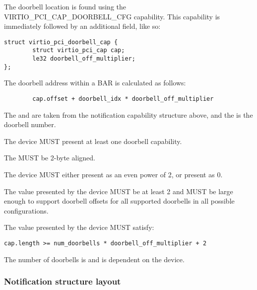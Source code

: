 The doorbell location is found using the VIRTIO_PCI_CAP_DOORBELL_CFG
capability.  This capability is immediately followed by an additional
field, like so:

\begin{lstlisting}
struct virtio_pci_doorbell_cap {
        struct virtio_pci_cap cap;
        le32 doorbell_off_multiplier;
};
\end{lstlisting}

The doorbell address within a BAR is calculated as follows:

\begin{lstlisting}
        cap.offset + doorbell_idx * doorbell_off_multiplier
\end{lstlisting}

The  and  are taken from the
notification capability structure above, and the  is the
doorbell number.

The device MUST present at least one doorbell capability.

The  MUST be 2-byte aligned.

The device MUST either present  as an even power of 2,
or present  as 0.

The value  presented by the device MUST be at least 2
and MUST be large enough to support doorbell offsets for all supported
doorbells in all possible configurations.

The value  presented by the device MUST satisfy:
\begin{lstlisting}
cap.length >= num_doorbells * doorbell_off_multiplier + 2
\end{lstlisting}

The number of doorbells is  and is dependent on the
device.

\subsubsection{Notification structure layout}\label{sec:Device Types / Vhost-user Device Backend / Additional Device Resources over PCI / Notification capability}

